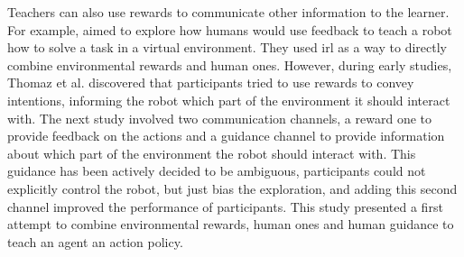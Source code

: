 

Teachers can also use rewards to communicate other information to the learner. For example, \cite{thomaz2008teachable} aimed to explore how humans would use feedback to teach a robot how to solve a task in a virtual environment. They used \acrfull{irl} as a way to directly combine environmental rewards and human ones. However, during early studies, Thomaz et al. discovered that participants tried to use rewards to convey intentions, informing the robot which part of the environment it should interact with. The next study involved two communication channels, a reward one to provide feedback on the actions and a guidance channel to provide information about which part of the environment the robot should interact with. This guidance has been actively decided to be ambiguous, participants could not explicitly control the robot, but just bias the exploration, and adding this second channel improved the performance of participants. This study presented a first attempt to combine environmental rewards, human ones and human guidance to teach an agent an action policy.



